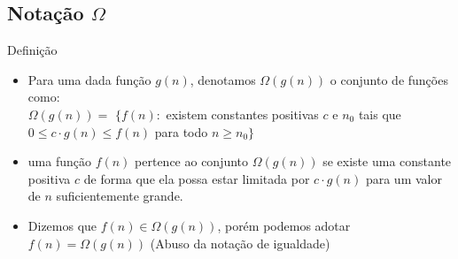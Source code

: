 \documentclass{beamer}
\begin{document}
\subsection{Notação $\Omega$}
\begin{frame}
    \begin{block}{Definição}
     \begin{itemize}
      \item Para uma dada função $g(n)$, denotamos $\Omega(g(n))$ o conjunto de funções como:\\
      $\Omega(g(n)) = $ $\{ f(n):$ existem constantes positivas $c$ e $n_0$ tais que $0\leq  c\cdot g(n) \leq f(n)$ para todo $n \geq n_0 \}$
      \item uma função $f(n)$ pertence ao conjunto $\Omega(g(n))$ se existe uma constante positiva $c$ de forma que ela possa estar limitada por $c\cdot g(n)$ para um valor de $n$ suficientemente grande.
      \item Dizemos que $f(n) \in \Omega(g(n))$, porém podemos adotar $f(n) = \Omega(g(n))$ (Abuso da notação de igualdade)
     \end{itemize}

    \end{block}

 \end{frame}
 
\end{document}
